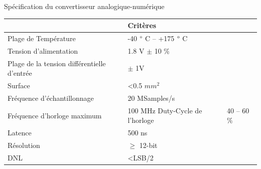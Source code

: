 \begin{mdframed}[linecolor=Prune,linewidth=1]
    \begin{center}
        \centering
        \caption[]{Spécification du convertisseur analogique-numérique}
        \label{tbl:adc-spec-fr}
        \begin{tabular}{ll}
            \toprule
                                         & Critères                                                                                                                                                   \\ \midrule
        Plage de Température            & -40 $\degree$ C -- +175 $\degree$ C                                                                                               \\
        Tension d'alimentation                   & 1.8 V $\pm$ 10 \%                                                                                                                              \\
        Plage de la tension différentielle d'entrée & $\pm$ 1V                                                                                                                                       \\
        Surface                             & \textless 0.5 \(mm^2\)                                                                                                                                      \\
        Fréquence d'échantillonnage       & 20 MSamples/s                                                                                                                                               \\
        Fréquence d'horloge maximum      & 100 MHz
        Duty-Cycle de l'horloge                & 40 -- 60 \%                                                                                                                                                 \\
        Latence                          & 500 ns                                                                                                                                                      \\
        Résolution                       & $\geq$ 12-bit                                                                                                                                     \\
        DNL                              & \textless LSB/2                                                                                                                                             \\

\end{tabular}
\end{center}
\end{mdframed}
